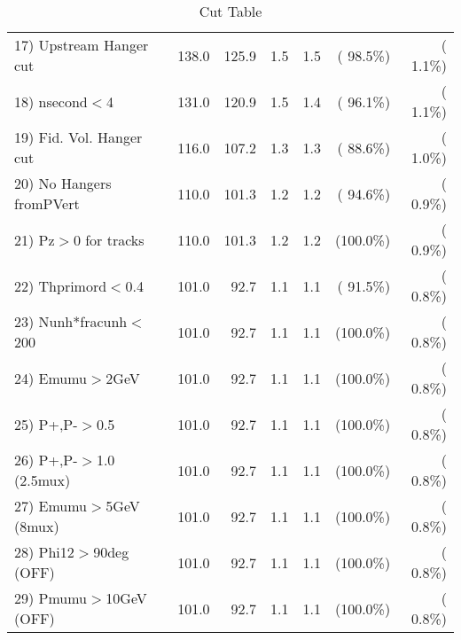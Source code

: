 \begin{table}[h!]
\begin{tabular}{||l||r|r|r|r|r|r||}
 17) Upstream Hanger cut  &        138.0 &        125.9 &          1.5 &          1.5 & ( 98.5\%) & (  1.1\%) \\
 18) nsecond$<$4          &        131.0 &        120.9 &          1.5 &          1.4 & ( 96.1\%) & (  1.1\%) \\
 19) Fid. Vol. Hanger cut &        116.0 &        107.2 &          1.3 &          1.3 & ( 88.6\%) & (  1.0\%) \\
 20) No Hangers fromPVert &        110.0 &        101.3 &          1.2 &          1.2 & ( 94.6\%) & (  0.9\%) \\
 21) Pz$>$0 for tracks    &        110.0 &        101.3 &          1.2 &          1.2 & (100.0\%) & (  0.9\%) \\
 22) Thprimord$<$0.4      &        101.0 &         92.7 &          1.1 &          1.1 & ( 91.5\%) & (  0.8\%) \\
 23) Nunh*fracunh$<$200   &        101.0 &         92.7 &          1.1 &          1.1 & (100.0\%) & (  0.8\%) \\
 24) Emumu$>$2GeV         &        101.0 &         92.7 &          1.1 &          1.1 & (100.0\%) & (  0.8\%) \\
 25) P+,P-$>$0.5          &        101.0 &         92.7 &          1.1 &          1.1 & (100.0\%) & (  0.8\%) \\
 26) P+,P-$>$1.0 (2.5mux) &        101.0 &         92.7 &          1.1 &          1.1 & (100.0\%) & (  0.8\%) \\
 27) Emumu$>$5GeV  (8mux) &        101.0 &         92.7 &          1.1 &          1.1 & (100.0\%) & (  0.8\%) \\
 28) Phi12$>$90deg  (OFF) &        101.0 &         92.7 &          1.1 &          1.1 & (100.0\%) & (  0.8\%) \\
 29) Pmumu$>$10GeV  (OFF) &        101.0 &         92.7 &          1.1 &          1.1 & (100.0\%) & (  0.8\%) \\
 \hline
 \hline
 \end{tabular}
 \caption{Cut Table           }
 \label{tab-cutcohjpsi-mumu_cohpip}
 \end{table}
